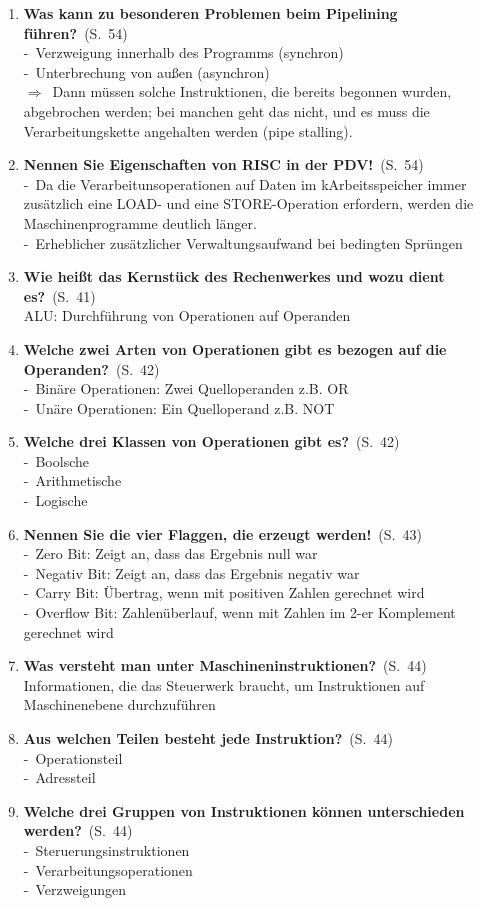 \documentclass[a4paper,12pt]{article}
\newcommand{\question}[3]{\pagebreak[3]\item {\textbf{#1?}}\ (S.\ #2)#3}
\newcommand{\statement}[3]{\pagebreak[3]\item {\textbf{#1!}}\ (S.\ #2)#3}
\newcommand{\catchword}[1]{\\-\ #1}
\newcommand{\normaltext}[1]{\\#1}
\newcommand{\result}[1]{\\ $\Rightarrow$\ #1}
\newcommand{\page}[1]{#1}
\begin{document}
\begin{enumerate}
   \question{Was kann zu besonderen Problemen beim Pipelining führen}{\page{54}}
  {
    \catchword{Verzweigung innerhalb des Programms (synchron)}
    \catchword{Unterbrechung von außen (asynchron)}
    \result{Dann müssen solche Instruktionen, die bereits begonnen wurden, abgebrochen 
    werden; bei manchen geht das nicht, und es muss die Verarbeitungskette angehalten 
    werden (pipe stalling).}
  }

  \statement{Nennen Sie Eigenschaften von RISC in der PDV}{\page{54}}
  {
    \catchword{Da die Verarbeitunsoperationen auf Daten im kArbeitsspeicher immer zusätzlich
    eine LOAD- und eine STORE-Operation erfordern, werden die Maschinenprogramme deutlich länger.}
    \catchword{Erheblicher zusätzlicher Verwaltungsaufwand bei bedingten Sprüngen}
  }

  \question{Wie heißt das Kernstück des Rechenwerkes und wozu dient es}{\page{41}}
  {
    \normaltext{ALU: Durchführung von Operationen auf Operanden}
  }

  \question{Welche zwei Arten von Operationen gibt es bezogen auf die Operanden}{\page{42}}
  {
    \catchword{Binäre Operationen: Zwei Quelloperanden z.B. OR}
    \catchword{Unäre Operationen: Ein Quelloperand z.B. NOT}
  }

  \question{Welche drei Klassen von Operationen gibt es}{\page{42}}
  {
    \catchword{Boolsche}
    \catchword{Arithmetische}
    \catchword{Logische}
  }

  \statement{Nennen Sie die vier Flaggen, die erzeugt werden}{\page{43}}
  {
    \catchword{Zero Bit: Zeigt an, dass das Ergebnis null war}
    \catchword{Negativ Bit: Zeigt an, dass das Ergebnis negativ war}
    \catchword{Carry Bit: Übertrag, wenn mit positiven Zahlen gerechnet wird}
    \catchword{Overflow Bit: Zahlenüberlauf, wenn mit Zahlen im 2-er Komplement gerechnet wird}
  }

  \question{Was versteht man unter Maschineninstruktionen}{\page{44}}
  {
    \normaltext{Informationen, die das Steuerwerk braucht, um Instruktionen auf 
                Maschinenebene durchzuführen}
  }

  \question{Aus welchen Teilen besteht jede Instruktion}{\page{44}}
  {
    \catchword{Operationsteil}
    \catchword{Adressteil}
  }

  \question{Welche drei Gruppen von Instruktionen können unterschieden werden}{\page{44}}
  {
    \catchword{Steruerungsinstruktionen}
    \catchword{Verarbeitungsoperationen}
    \catchword{Verzweigungen}
  }


\end{enumerate}
\end{document}

